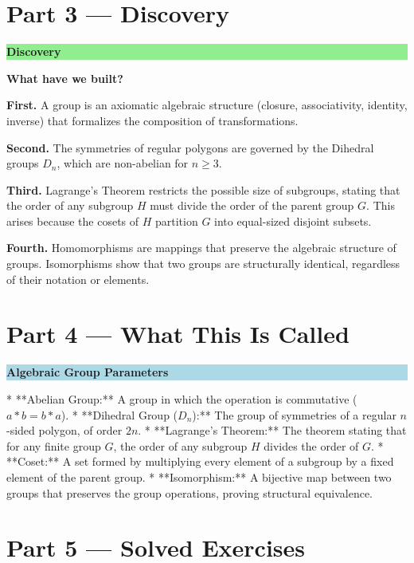 \documentclass[12pt, a4paper]{article}
\newenvironment{discoverybox}
  {\par\medskip\fillcolorbox{LightGreen}{DiscoveryColor}{Discovery}}
  {\par\medskip}
\newenvironment{namedconcept}[1]
  {\par\medskip\fillcolorbox{LightBlue}{NavyBlue}{#1}}
  {\par\medskip}
\newcommand{\fillcolorbox}[3]{%
  \noindent
  \filldrawbox{#1}{#2}{\textbf{\sffamily\color{white}#3}}\par\nobreak\vspace{4pt}
}
\newcommand{\filldrawbox}[3]{%
  \colorbox{#1}{\parbox{\dimexpr\linewidth-2\fboxsep\relax}{%
    \vspace{4pt}\noindent\hspace{4pt}#3\vspace{4pt}%
  }}%
}
\begin{document}
\newpage

\section{Part 3 --- Discovery}

\begin{discoverybox}
\textbf{What have we built?}

\textbf{First.} A group is an axiomatic algebraic structure (closure, associativity, identity, inverse) that formalizes the composition of transformations.

\textbf{Second.} The symmetries of regular polygons are governed by the Dihedral groups $D_n$, which are non-abelian for $n \ge 3$.

\textbf{Third.} Lagrange's Theorem restricts the possible size of subgroups, stating that the order of any subgroup $H$ must divide the order of the parent group $G$. This arises because the cosets of $H$ partition $G$ into equal-sized disjoint subsets.

\textbf{Fourth.} Homomorphisms are mappings that preserve the algebraic structure of groups. Isomorphisms show that two groups are structurally identical, regardless of their notation or elements.
\end{discoverybox}

\newpage

\section{Part 4 --- What This Is Called}

\begin{namedconcept}{Algebraic Group Parameters}
* **Abelian Group:** A group in which the operation is commutative ($a*b = b*a$).
* **Dihedral Group ($D_n$):** The group of symmetries of a regular $n$-sided polygon, of order $2n$.
* **Lagrange's Theorem:** The theorem stating that for any finite group $G$, the order of any subgroup $H$ divides the order of $G$.
* **Coset:** A set formed by multiplying every element of a subgroup by a fixed element of the parent group.
* **Isomorphism:** A bijective map between two groups that preserves the group operations, proving structural equivalence.
\end{namedconcept}

\newpage

\section{Part 5 --- Solved Exercises}
\end{document}
